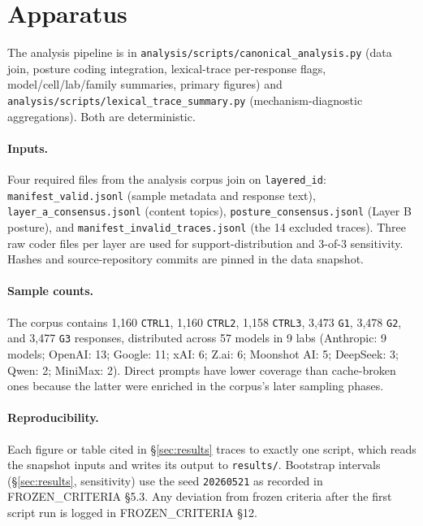 \section{Apparatus}
\label{sec:experiments}

The analysis pipeline is in \texttt{analysis/scripts/canonical\_analysis.py} (data join, posture coding integration, lexical-trace per-response flags, model/cell/lab/family summaries, primary figures) and \texttt{analysis/scripts/lexical\_trace\_summary.py} (mechanism-diagnostic aggregations). Both are deterministic.

\paragraph{Inputs.}
Four required files from the analysis corpus join on \texttt{layered\_id}: \texttt{manifest\_valid.jsonl} (sample metadata and response text), \texttt{layer\_a\_consensus.jsonl} (content topics), \texttt{posture\_consensus.jsonl} (Layer B posture), and \texttt{manifest\_invalid\_traces.jsonl} (the 14 excluded traces). Three raw coder files per layer are used for support-distribution and 3-of-3 sensitivity. Hashes and source-repository commits are pinned in the data snapshot.

\paragraph{Sample counts.}
The corpus contains 1{,}160 \texttt{CTRL1}, 1{,}160 \texttt{CTRL2}, 1{,}158 \texttt{CTRL3}, 3{,}473 \texttt{G1}, 3{,}478 \texttt{G2}, and 3{,}477 \texttt{G3} responses, distributed across 57 models in 9 labs (Anthropic: 9 models; OpenAI: 13; Google: 11; xAI: 6; Z.ai: 6; Moonshot AI: 5; DeepSeek: 3; Qwen: 2; MiniMax: 2). Direct prompts have lower coverage than cache-broken ones because the latter were enriched in the corpus's later sampling phases.

\paragraph{Reproducibility.}
Each figure or table cited in \S\ref{sec:results} traces to exactly one script, which reads the snapshot inputs and writes its output to \texttt{results/}. Bootstrap intervals (\S\ref{sec:results}, sensitivity) use the seed \texttt{20260521} as recorded in FROZEN\_CRITERIA \S5.3. Any deviation from frozen criteria after the first script run is logged in FROZEN\_CRITERIA \S12.
